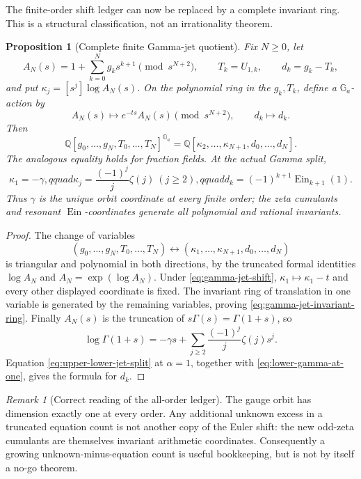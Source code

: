 \documentclass[11pt]{article}
\newtheorem{proposition}[theorem]{Proposition}
\theoremstyle{definition}
\theoremstyle{remark}
\newtheorem{remark}[theorem]{Remark}
\newcommand{\Q}{\mathbb Q}
\newcommand{\Ein}{\operatorname{Ein}}
\begin{document}
The finite-order shift ledger can now be replaced by a complete invariant
ring.  This is a structural classification, not an irrationality theorem.

\begin{proposition}[Complete finite Gamma-jet quotient]
\label{prop:finite-gamma-jet-quotient}
Fix \(N\ge0\), let
\[
 A_N(s)=1+\sum_{k=0}^Ng_ks^{k+1}\pmod {s^{N+2}},
 \qquad T_k=U_{1,k},\qquad d_k=g_k-T_k,
\]
and put \(\kappa_j=[s^j]\log A_N(s)\).  On the polynomial ring in the
\(g_k,T_k\), define a \(\mathbb G_a\)-action by
\begin{equation}\label{eq:gamma-jet-shift}
 A_N(s)\longmapsto e^{-ts}A_N(s)\pmod {s^{N+2}},
 \qquad d_k\longmapsto d_k.
\end{equation}
Then
\begin{equation}\label{eq:gamma-jet-invariant-ring}
 \boxed{\displaystyle
 \Q[g_0,\ldots,g_N,T_0,\ldots,T_N]^{\mathbb G_a}
 =\Q[\kappa_2,\ldots,\kappa_{N+1},d_0,\ldots,d_N].}
\end{equation}
The analogous equality holds for fraction fields.  At the actual Gamma
split,
\begin{equation}\label{eq:actual-gamma-jet-invariants}
 \kappa_1=-\gamma,qquad
 \kappa_j=\frac{(-1)^j}{j}\zeta(j)\ (j\ge2),qquad
 d_k=(-1)^{k+1}\Ein_{k+1}(1).
\end{equation}
Thus \(\gamma\) is the unique orbit coordinate at every finite order; the
zeta cumulants and resonant \(\Ein\)-coordinates generate all polynomial
and rational invariants.
\end{proposition}

\begin{proof}
The change of variables
\[
 (g_0,\ldots,g_N,T_0,\ldots,T_N)
 \longleftrightarrow
 (\kappa_1,\ldots,\kappa_{N+1},d_0,\ldots,d_N)
\]
is triangular and polynomial in both directions, by the truncated formal
identities \(\log A_N\) and \(A_N=\exp(\log A_N)\).  Under
\eqref{eq:gamma-jet-shift}, \(\kappa_1\mapsto\kappa_1-t\) and every other
displayed coordinate is fixed.  The invariant ring of translation in one
variable is generated by the remaining variables, proving
\eqref{eq:gamma-jet-invariant-ring}.  Finally
\(A_N(s)\) is the truncation of
\(s\Gamma(s)=\Gamma(1+s)\), so
\[
 \log\Gamma(1+s)=-\gamma s+
 \sum_{j\ge2}\frac{(-1)^j}{j}\zeta(j)s^j.
\]
Equation \eqref{eq:upper-lower-jet-split} at \(\alpha=1\), together with
\eqref{eq:lower-gamma-at-one}, gives the formula for \(d_k\).
\end{proof}

\begin{remark}[Correct reading of the all-order ledger]
The gauge orbit has dimension exactly one at every order.  Any additional
unknown excess in a truncated equation count is not another copy of the
Euler shift: the new odd-zeta cumulants are themselves invariant arithmetic
coordinates.  Consequently a growing unknown-minus-equation count is useful
bookkeeping, but is not by itself a no-go theorem.
\end{remark}
\end{document}
